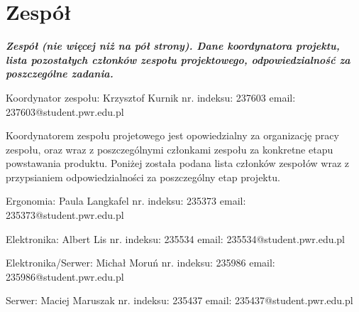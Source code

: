 \documentclass[10pt, a4paper]{article}
\begin{document}
\section{Zespół}
\textit{\textbf{Zespół (nie więcej niż na pół strony). Dane koordynatora projektu, lista pozostałych członków zespołu projektowego, odpowiedzialność za poszczególne zadania.}}

\begin{description}[font=$\bullet$~\normalfont]
\item Koordynator zespołu: Krzysztof Kurnik nr. indeksu: 237603 email: 237603@student.pwr.edu.pl
\end{description}
Koordynatorem zespołu projetowego jest opowiedzialny za organizację pracy zespołu, oraz wraz z poszczególnymi członkami zespołu za konkretne etapu powstawania produktu. Poniżej została podana lista członków zespołów wraz z przypsianiem odpowiedzialności za poszczególny etap projektu.
\begin{description}[font=$\bullet$~\normalfont]
\item Ergonomia: Paula Langkafel nr. indeksu: 235373 email: 235373@student.pwr.edu.pl
\item Elektronika: Albert Lis nr. indeksu: 235534 email: 235534@student.pwr.edu.pl
\item Elektronika/Serwer: Michał Moruń nr. indeksu: 235986 email: 235986@student.pwr.edu.pl
\item Serwer: Maciej Maruszak nr. indeksu: 235437 email: 235437@student.pwr.edu.pl
\end{description}
\end{document}

